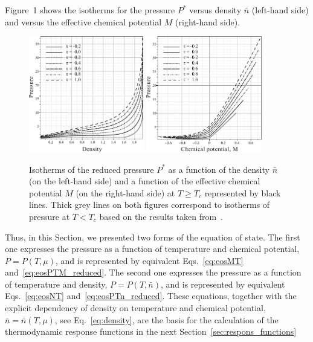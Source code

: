 \documentclass[12pt]{article}
\begin{document}
	Figure~1 shows the isotherms for the pressure $P^*$ versus density $\bar{n}$ (left-hand side) and versus the effective chemical potential $M$ (right-hand side).
	\begin{figure}[h!]
		\includegraphics[width=0.446\textwidth]{f1a1.pdf} 
		\includegraphics[width=0.45\textwidth]{f1b1.pdf} 
		\vskip-3mm\caption{Isotherms of the reduced pressure $P^*$ as a function of the density $\bar n$ (on the left-hand side) and a function of the effective chemical potential $M$ (on the right-hand side) at $T \geq T_c$ represented by black lines. Thick grey lines on both figures correspond to isotherms of pressure at $T < T_c$ based on the results taken from~\cite{KozlovskiiDobush2020}. 
		}\label{fig1}
	\end{figure}
	
	Thus, in this Section, we presented two forms of the equation of state. The first one expresses the pressure as a function of temperature and chemical potential, $P = P(T, \mu)$, and is represented by equivalent Eqs.~\eqref{eq:eosMT} and~\eqref{eq:eosPTM_reduced}. The second one expresses the pressure as a function of temperature and density, $P = P(T, \bar{n})$, and is represented by equivalent Eqs.~\eqref{eq:eosNT} and~\eqref{eq:eosPTn_reduced}. These equations, together with the explicit dependency of density on temperature and chemical potential, $\bar{n} = \bar{n}(T, \mu)$, see Eq.~\eqref{eq:density}, are the basis for the calculation of the thermodynamic response functions in the next Section~\ref{sec:respons_functions}  
	
\end{document}
